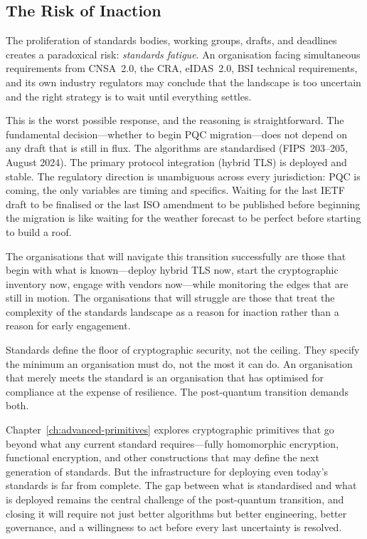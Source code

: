 \subsection{The Risk of Inaction}
\label{subsec:risk-inaction}

The proliferation of standards bodies, working groups, drafts, and deadlines creates a paradoxical risk: \emph{standards fatigue}. An organisation facing simultaneous requirements from CNSA~2.0, the CRA, eIDAS~2.0, BSI technical requirements, and its own industry regulators may conclude that the landscape is too uncertain and the right strategy is to wait until everything settles.

This is the worst possible response, and the reasoning is straightforward. The fundamental decision---whether to begin PQC migration---does not depend on any draft that is still in flux. The algorithms are standardised (FIPS~203--205, August 2024). The primary protocol integration (hybrid TLS) is deployed and stable. The regulatory direction is unambiguous across every jurisdiction: PQC is coming, the only variables are timing and specifics. Waiting for the last IETF draft to be finalised or the last ISO amendment to be published before beginning the migration is like waiting for the weather forecast to be perfect before starting to build a roof.

The organisations that will navigate this transition successfully are those that begin with what is known---deploy hybrid TLS now, start the cryptographic inventory now, engage with vendors now---while monitoring the edges that are still in motion. The organisations that will struggle are those that treat the complexity of the standards landscape as a reason for inaction rather than a reason for early engagement.

Standards define the floor of cryptographic security, not the ceiling. They specify the minimum an organisation must do, not the most it can do. An organisation that merely meets the standard is an organisation that has optimised for compliance at the expense of resilience. The post-quantum transition demands both.

Chapter~\ref{ch:advanced-primitives} explores cryptographic primitives that go beyond what any current standard requires---fully homomorphic encryption, functional encryption, and other constructions that may define the next generation of standards. But the infrastructure for deploying even today's standards is far from complete. The gap between what is standardised and what is deployed remains the central challenge of the post-quantum transition, and closing it will require not just better algorithms but better engineering, better governance, and a willingness to act before every last uncertainty is resolved.

